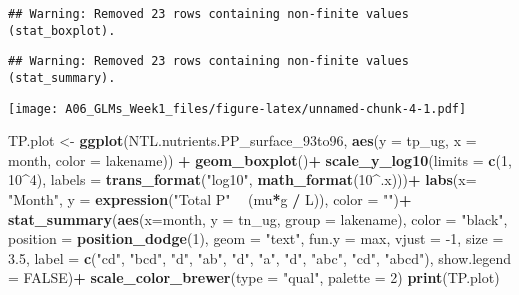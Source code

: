 \documentclass[
]{article}
\newenvironment{Shaded}{\begin{snugshade}}{\end{snugshade}}
\newcommand{\DataTypeTok}[1]{\textcolor[rgb]{0.13,0.29,0.53}{#1}}
\newcommand{\DecValTok}[1]{\textcolor[rgb]{0.00,0.00,0.81}{#1}}
\newcommand{\FloatTok}[1]{\textcolor[rgb]{0.00,0.00,0.81}{#1}}
\newcommand{\KeywordTok}[1]{\textcolor[rgb]{0.13,0.29,0.53}{\textbf{#1}}}
\newcommand{\NormalTok}[1]{#1}
\newcommand{\OperatorTok}[1]{\textcolor[rgb]{0.81,0.36,0.00}{\textbf{#1}}}
\newcommand{\OtherTok}[1]{\textcolor[rgb]{0.56,0.35,0.01}{#1}}
\newcommand{\StringTok}[1]{\textcolor[rgb]{0.31,0.60,0.02}{#1}}
\begin{document}
\begin{verbatim}
## Warning: Removed 23 rows containing non-finite values (stat_boxplot).
\end{verbatim}

\begin{verbatim}
## Warning: Removed 23 rows containing non-finite values (stat_summary).
\end{verbatim}

\texttt{[image: A06\_GLMs\_Week1\_files/figure-latex/unnamed-chunk-4-1.pdf]}

\begin{Shaded}
\begin{Highlighting}[]
\NormalTok{TP.plot <-}\StringTok{ }\KeywordTok{ggplot}\NormalTok{(NTL.nutrients.PP_surface_93to96, }\KeywordTok{aes}\NormalTok{(}\DataTypeTok{y =}\NormalTok{ tp_ug, }\DataTypeTok{x =}\NormalTok{ month, }\DataTypeTok{color =}\NormalTok{ lakename)) }\OperatorTok{+}
\StringTok{  }\KeywordTok{geom_boxplot}\NormalTok{()}\OperatorTok{+}
\StringTok{  }\KeywordTok{scale_y_log10}\NormalTok{(}\DataTypeTok{limits =} \KeywordTok{c}\NormalTok{(}\DecValTok{1}\NormalTok{, }\DecValTok{10}\OperatorTok{^}\DecValTok{4}\NormalTok{), }\DataTypeTok{labels =} \KeywordTok{trans_format}\NormalTok{(}\StringTok{"log10"}\NormalTok{, }\KeywordTok{math_format}\NormalTok{(}\DecValTok{10}\OperatorTok{^}\NormalTok{.x)))}\OperatorTok{+}
\StringTok{  }\KeywordTok{labs}\NormalTok{(}\DataTypeTok{x=} \StringTok{"Month"}\NormalTok{, }\DataTypeTok{y =} \KeywordTok{expression}\NormalTok{(}\StringTok{"Total P"} \OperatorTok{~}\StringTok{ }\NormalTok{(mu}\OperatorTok{*}\NormalTok{g }\OperatorTok{/}\StringTok{ }\NormalTok{L)), }\DataTypeTok{color =} \StringTok{""}\NormalTok{)}\OperatorTok{+}
\StringTok{  }\KeywordTok{stat_summary}\NormalTok{(}\KeywordTok{aes}\NormalTok{(}\DataTypeTok{x=}\NormalTok{month, }\DataTypeTok{y =}\NormalTok{ tn_ug, }\DataTypeTok{group =}\NormalTok{ lakename), }\DataTypeTok{color =} \StringTok{"black"}\NormalTok{, }\DataTypeTok{position =} \KeywordTok{position_dodge}\NormalTok{(}\DecValTok{1}\NormalTok{), }
               \DataTypeTok{geom =} \StringTok{"text"}\NormalTok{, }\DataTypeTok{fun.y =}\NormalTok{ max, }\DataTypeTok{vjust =} \DecValTok{-1}\NormalTok{, }\DataTypeTok{size =} \FloatTok{3.5}\NormalTok{,}
               \DataTypeTok{label =} \KeywordTok{c}\NormalTok{(}\StringTok{"cd"}\NormalTok{, }\StringTok{"bcd"}\NormalTok{, }\StringTok{"d"}\NormalTok{, }\StringTok{"ab"}\NormalTok{, }\StringTok{"d"}\NormalTok{, }\StringTok{"a"}\NormalTok{,}
                         \StringTok{"d"}\NormalTok{, }\StringTok{"abc"}\NormalTok{, }\StringTok{"cd"}\NormalTok{, }\StringTok{"abcd"}\NormalTok{),}
               \DataTypeTok{show.legend =} \OtherTok{FALSE}\NormalTok{)}\OperatorTok{+}
\StringTok{  }\KeywordTok{scale_color_brewer}\NormalTok{(}\DataTypeTok{type =} \StringTok{"qual"}\NormalTok{, }\DataTypeTok{palette =} \DecValTok{2}\NormalTok{)}
\KeywordTok{print}\NormalTok{(TP.plot)}
\end{Highlighting}
\end{Shaded}
\end{document}
